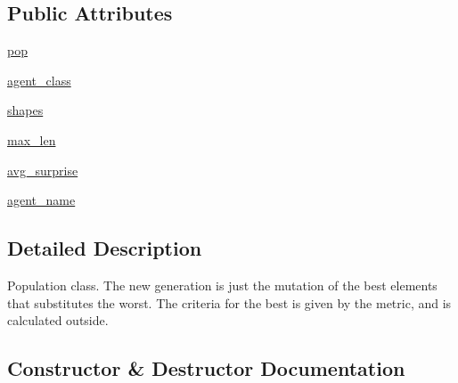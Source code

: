 \subsection*{Public Attributes}
\begin{DoxyCompactItemize}
\item 
\hyperlink{classtaxons_1_1core_1_1evolution_1_1population_1_1_population_a99f6a4851f5f24ade97ea06514f440ec}{pop}
\item 
\hyperlink{classtaxons_1_1core_1_1evolution_1_1population_1_1_population_a7dcc43cc095c81d1251c63d5a0b5ff4a}{agent\+\_\+class}
\item 
\hyperlink{classtaxons_1_1core_1_1evolution_1_1population_1_1_population_ab32f467a98b76b3a49fd51ae2c3de7ab}{shapes}
\item 
\hyperlink{classtaxons_1_1core_1_1evolution_1_1population_1_1_population_a699a357a32308ad63d09479e96336dba}{max\+\_\+len}
\item 
\hyperlink{classtaxons_1_1core_1_1evolution_1_1population_1_1_population_afacd2cc1f68520ca06a4aedcfcedbd8f}{avg\+\_\+surprise}
\item 
\hyperlink{classtaxons_1_1core_1_1evolution_1_1population_1_1_population_a794d98e7cf0702cd429f0c90c83d4a09}{agent\+\_\+name}
\end{DoxyCompactItemize}


\subsection{Detailed Description}
\begin{DoxyVerb}Population class. The new generation is just the mutation of the best elements that substitutes the worst.
The criteria for the best is given by the metric, and is calculated outside.
\end{DoxyVerb}
 

\subsection{Constructor \& Destructor Documentation}
